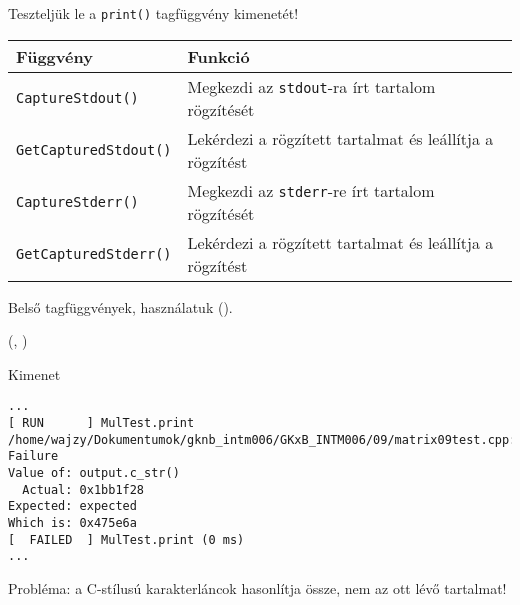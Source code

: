 \begin{frame}
  Teszteljük le a \texttt{print()} tagfüggvény kimenetét!
  \vfill
  \begin{tabular}{ll}
    \textbf{Függvény} & \textbf{Funkció}\\ \hline
    \texttt{CaptureStdout()} & Megkezdi az \texttt{stdout}-ra írt tartalom rögzítését\\
    \texttt{GetCapturedStdout()} & Lekérdezi a rögzített tartalmat és leállítja a rögzítést\\
    \texttt{CaptureStderr()} & Megkezdi az \texttt{stderr}-re írt tartalom rögzítését\\
    \texttt{GetCapturedStderr()} & Lekérdezi a rögzített tartalmat és leállítja a rögzítést\\
  \end{tabular}
  \vfill
  Belső tagfüggvények, használatuk  ().
\end{frame}

\begin{frame}
  \begin{exampleblock}{ %
    (, %
     )}
    \small
    
  \end{exampleblock}
\end{frame}

\begin{frame}[fragile]
  \begin{block}{Kimenet}
    \footnotesize
    \begin{verbatim}
...
[ RUN      ] MulTest.print
/home/wajzy/Dokumentumok/gknb_intm006/GKxB_INTM006/09/matrix09test.cpp:84: Failure
Value of: output.c_str()
  Actual: 0x1bb1f28
Expected: expected
Which is: 0x475e6a
[  FAILED  ] MulTest.print (0 ms)
...
\end{verbatim}
  \end{block}
  \vfill
  Probléma: a C-stílusú karakterláncok  hasonlítja össze, nem az ott lévő tartalmat!
\end{frame}

